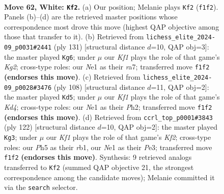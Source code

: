\documentclass[11pt]{article}
\begin{document}
\clearpage

\begin{figure}[p]\centering
\begin{subfigure}{0.46\textwidth}\centering
\resizebox{\linewidth}{!}{%
\newchessgame
\chessboard[
  setfen={8/8/7R/7P/2pk4/8/1P6/4NK2 w - - 1 62},
  showmover=false,
  pgfstyle=straightmove, color=movearrow, markmove={f1-f2}
]}
\caption{}
\end{subfigure}\hfill
\begin{subfigure}{0.46\textwidth}\centering
\resizebox{\linewidth}{!}{%
\newchessgame
\chessboard[
  setfen={8/R5k1/8/6p1/8/4KP1p/7r/8 b - - 5 66},
  showmover=false,
  pgfstyle=straightmove, color=movearrow, markmove={g7-g6}
]}
\caption{}
\end{subfigure}
\\[4pt]
\begin{subfigure}{0.46\textwidth}\centering
\resizebox{\linewidth}{!}{%
\newchessgame
\chessboard[
  setfen={8/6k1/4R3/4P2p/3K2p1/8/7P/8 w - - 1 55},
  showmover=false,
  pgfstyle=straightmove, color=movearrow, markmove={d4-d5}
]}
\caption{}
\end{subfigure}\hfill
\begin{subfigure}{0.46\textwidth}\centering
\resizebox{\linewidth}{!}{%
\newchessgame
\chessboard[
  setfen={8/R7/4kp2/8/6P1/4P3/5K2/1r6 w - - 17 62},
  showmover=false,
  pgfstyle=straightmove, color=movearrow, markmove={f2-g3}
]}
\caption{}
\end{subfigure}
\caption{\textbf{Move 62, White: \texttt{Kf2}.} (a) Our position; Melanie plays \texttt{Kf2} (\texttt{f1f2}). Panels (b)--(d) are the retrieved master positions whose correspondence most drove this move (highest QAP objective among those that transfer to it). (b) Retrieved from \texttt{lichess\_elite\_2024-09\_p0031\#2441} (ply 131) [structural distance $d$=10, QAP obj=3]: the master played \texttt{Kg6}; under $\mu$ our \emph{Kf1} plays the role of that game's \emph{Kg2}; cross-type roles: our \emph{N}e1 as their \emph{r}a7; transferred move \texttt{f1f2} \textbf{(endorses this move)}. (c) Retrieved from \texttt{lichess\_elite\_2024-09\_p0028\#3476} (ply 108) [structural distance $d$=11, QAP obj=2]: the master played \texttt{Kd5}; under $\mu$ our \emph{Kf1} plays the role of that game's \emph{Kd4}; cross-type roles: our \emph{N}e1 as their \emph{P}h2; transferred move \texttt{f1f2} \textbf{(endorses this move)}. (d) Retrieved from \texttt{ccrl\_top\_p0001\#3843} (ply 122) [structural distance $d$=10, QAP obj=2]: the master played \texttt{Kg3}; under $\mu$ our \emph{Kf1} plays the role of that game's \emph{Kf2}; cross-type roles: our \emph{P}h5 as their \emph{r}b1, our \emph{N}e1 as their \emph{P}e3; transferred move \texttt{f1f2} \textbf{(endorses this move)}. Synthesis: 9 retrieved analogs transferred to \texttt{Kf2} (summed QAP objective 21, the strongest correspondence among the candidate moves); Melanie committed it via the \texttt{search} selector.}
\label{fig:thought-m122}
\end{figure}
\end{document}
